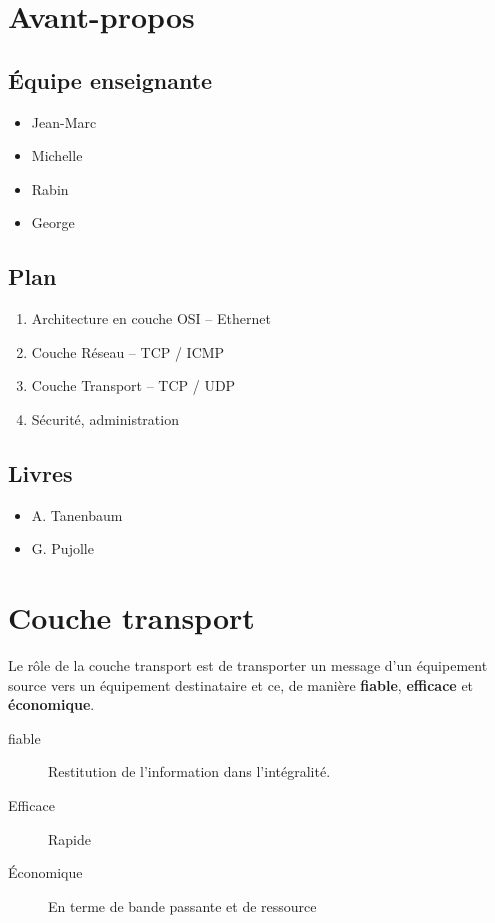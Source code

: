 \documentclass[12pt,a4paper,openany]{book}
\begin{document}
	\thispagestyle{empty} %
	\titleBC{} 
	\dominitoc
	\setcounter{tocdepth}{1}
	\setcounter{secnumdepth}{3}
	\setcounter{minitocdepth}{1}
	\chapter*{Avant-propos}
	\section{Équipe enseignante}
	\begin{itemize}
		\item Jean-Marc 
		\item Michelle 
		\item Rabin 
		\item George 
	\end{itemize}
	\section{Plan}
	\begin{enumerate}
		\item Architecture en couche OSI -- Ethernet
		\item Couche Réseau -- TCP / ICMP
		\item Couche Transport -- TCP / UDP
		\item Sécurité, administration
	\end{enumerate}
	\section{Livres}
	\begin{itemize}
		\item A. Tanenbaum
		\item G. Pujolle
	\end{itemize}
	\tableofcontents
	
	\chapter{Couche transport}
	Le rôle de la couche transport est de transporter un message d'un équipement source vers un équipement destinataire et ce, de manière \textbf{fiable},
	\textbf{efficace} et \textbf{économique}.

	\begin{description}
		\item[fiable] Restitution de l'information dans l'intégralité.
		\item[Efficace] Rapide
		\item[Économique] En terme de bande passante et de ressource
	\end{description}
\end{document}
